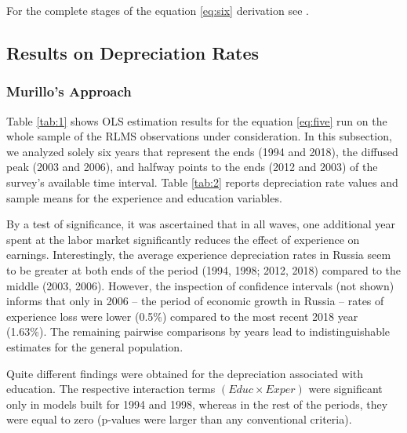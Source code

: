 \documentclass[12pt,a4paper]{article}
\numberwithin{equation}{section}
\begin{document}
For the complete stages of the equation \ref{eq:six} derivation see \parencite{weber_173._2008}.

\subsection*{Results on Depreciation Rates}
\subsubsection*{Murillo's Approach}

Table \ref{tab:1} shows OLS estimation results for the equation \ref{eq:five} run on the whole sample of the RLMS observations under consideration. In this subsection, we analyzed solely six years that represent the ends (1994 and 2018), the diffused peak (2003 and 2006), and halfway points to the ends (2012 and 2003) of the survey's available time interval. Table \ref{tab:2} reports depreciation rate values and sample means for the experience and education variables.

By a test of significance, it was ascertained that in all waves, one additional year spent at the labor market significantly reduces the effect of experience on earnings. Interestingly, the average experience depreciation rates in Russia seem to be greater at both ends of the period (1994, 1998; 2012, 2018) compared to the middle (2003, 2006). However, the inspection of confidence intervals (not shown) informs that only in 2006  -- the period of economic growth in Russia -- rates of experience loss were lower (0.5\%) compared to the most recent 2018 year (1.63\%). The remaining pairwise comparisons by years lead to indistinguishable estimates for the general population. 

Quite different findings were obtained for the depreciation associated with education. The respective interaction terms $(Educ \times Exper)$ were significant only in models built for 1994 and 1998, whereas in the rest of the periods, they were equal to zero (p-values were larger than any conventional criteria).
\end{document}
